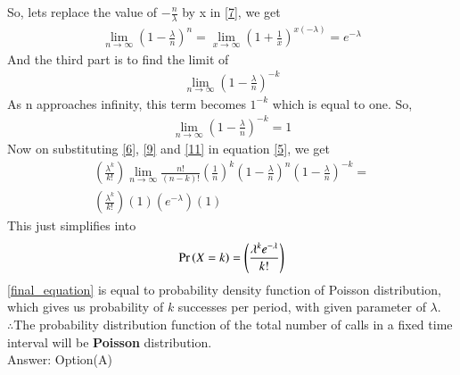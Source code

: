 \documentclass[journal,12pt,twocolumn]{IEEEtran}
\begin{document}
So, lets replace the value of $-\frac{n}{\lambda}$ by x in \eqref{7}, we get
\begin{align}\label{9}
    \lim_{n \to \infty}\left(1-\frac{\lambda}{n}\right)^n =\lim_{x \to \infty}\left(1+\frac{1}{x}\right)^{x(-\lambda)}=e^{-\lambda}
\end{align}
And the third part is to find the limit of 
\begin{align}
    \lim_{n \to \infty}\left(1-\frac{\lambda}{n}\right)^{-k}
\end{align}
As n approaches infinity, this term becomes $1^{-k}$ which is equal to one.
So,
\begin{align}\label{11}
    \lim_{n \to \infty}\left(1-\frac{\lambda}{n}\right)^{-k}=1
\end{align}
Now on substituting \eqref{6}, \eqref{9} and \eqref{11} in equation \eqref{5}, we get
\begin{multline}  
    \left(\frac{\lambda^k}{k!}\right)\lim_{n \to \infty}\frac{n!}{(n-k)!}\left(\frac{1}{n}\right)^k\left(1-\frac{\lambda}{n}\right)^n\left(1-\frac{\lambda}{n}\right)^{-k}=\\
    \left(\frac{\lambda^k}{k!}\right)(1)\left(e^{-\lambda}\right)(1)
\end{multline}
This just simplifies into
\begin{align}\label{final_equation}
    \Pr\left(X=k\right)=\left(\frac{\lambda^k e^{-\lambda}}{k!}\right)
\end{align}
   \eqref{final_equation} is equal to probability density function of Poisson distribution, which gives us probability of $k$ successes per period, with given parameter of $\lambda$.\\
   
   $\therefore $The probability distribution function of the total
number of calls in a fixed time interval will be \textbf{Poisson} distribution.\\
Answer: Option(A)
\end{document}
